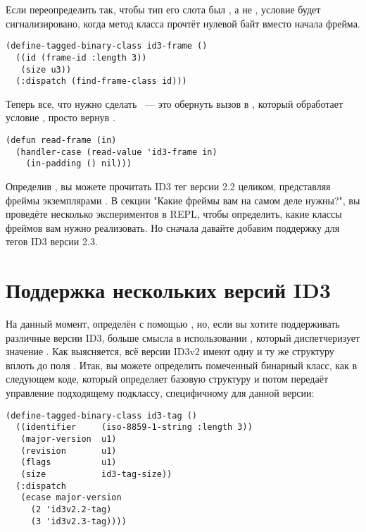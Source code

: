 Если переопределить  так, чтобы тип его слота  был
, а не , условие будет сигнализировано, когда метод
 класса  прочтёт нулевой байт вместо начала фрейма.

\begin{lstlisting}
(define-tagged-binary-class id3-frame ()
  ((id (frame-id :length 3))
   (size u3))
  (:dispatch (find-frame-class id)))
\end{lstlisting}

Теперь все, что нужно сделать ~--- это обернуть вызов  в
, который обработает условие , просто вернув
.

\begin{lstlisting}
(defun read-frame (in)
  (handler-case (read-value 'id3-frame in)
    (in-padding () nil)))
\end{lstlisting}

Определив , вы можете прочитать ID3 тег версии 2.2 целиком, представляя
фреймы экземплярами . В секции "Какие фреймы вам на самом деле
нужны?", вы проведёте несколько экспериментов в REPL, чтобы определить, какие классы
фреймов вам нужно реализовать. Но сначала давайте добавим поддержку для тегов ID3 версии
2.3.

\section{Поддержка нескольких версий ID3}

На данный момент,  определён с помощью , но, если
вы хотите поддерживать различные версии ID3, больше смысла в использовании
, который диспетчеризует значение
. Как выясняется, всё версии ID3v2 имеют одну и ту же структуру вплоть
до поля . Итак, вы можете определить помеченный бинарный класс, как в следующем
коде, который определяет базовую структуру и потом передаёт управление подходящему
подклассу, специфичному для данной версии:

\begin{lstlisting}
(define-tagged-binary-class id3-tag ()
  ((identifier     (iso-8859-1-string :length 3))
   (major-version  u1)
   (revision       u1)
   (flags          u1)
   (size           id3-tag-size))
  (:dispatch 
   (ecase major-version
     (2 'id3v2.2-tag)
     (3 'id3v2.3-tag))))
\end{lstlisting}

